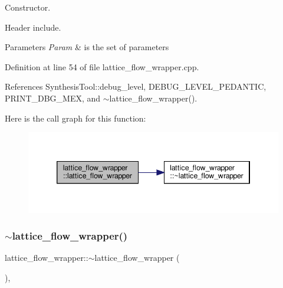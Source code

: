 Constructor. 

Header include.


\begin{DoxyParams}{Parameters}
{\em Param} & is the set of parameters \\
\hline
\end{DoxyParams}


Definition at line 54 of file lattice\+\_\+flow\+\_\+wrapper.\+cpp.



References Synthesis\+Tool\+::debug\+\_\+level, D\+E\+B\+U\+G\+\_\+\+L\+E\+V\+E\+L\+\_\+\+P\+E\+D\+A\+N\+T\+IC, P\+R\+I\+N\+T\+\_\+\+D\+B\+G\+\_\+\+M\+EX, and $\sim$lattice\+\_\+flow\+\_\+wrapper().

Here is the call graph for this function\+:
\nopagebreak
\begin{figure}[H]
\begin{center}
\leavevmode
\includegraphics[width=346pt]{de/d90/classlattice__flow__wrapper_a76ce7f3d8b84cbbf9cd7f092092276e6_cgraph}
\end{center}
\end{figure}
\mbox{\label{classlattice__flow__wrapper_a00583cc0d25a13ef910ab0dd87f62feb}} 
\subsubsection{\texorpdfstring{$\sim$lattice\+\_\+flow\+\_\+wrapper()}{~lattice\_flow\_wrapper()}}
{\footnotesize\ttfamily lattice\+\_\+flow\+\_\+wrapper\+::$\sim$lattice\+\_\+flow\+\_\+wrapper (\begin{DoxyParamCaption}{ }\end{DoxyParamCaption})\hspace{0.3cm}{\ttfamily [override]}, {\ttfamily [default]}}



